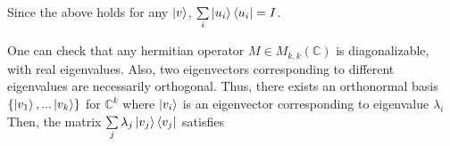 Since the above holds for any $\ket{v}$, $\sum\limits_i \ket{u_i}\bra{u_i}=I$.




\begin{comment}
Conventionally, for a ket $\ket{v}$, there is a corresponding dual vector \textit{"bra"} $\bra{v}$ such that
\begin{equation} \label{bra defn}
    \bra{v}(\ket{w}):=\braket{v|w}:=(\ket{v}, \ket{w})
\end{equation}
It turns out that the matrix representation of dual vectors is just a row vector as illustrated below:\\
Let $\{\ket{u_i}\}_{i=1}^{i=n}$ be some orthonormal basis of an inner product space V. Let $ \ket{v}=\sum_j v_j \ket{u_j}, \ket{w}=\sum_i w_i \ket{u_i}$. Since $(\ket{u_i},\ket{u_j})=\delta_{ij}$, using \eqref{inner product defn} and \eqref{bra defn}, we get
\begin{equation} \label{eqn: braket}
    \braket{v|w}=(\sum_j v_j \ket{u_j}, \sum_i w_i \ket{u_i})=\sum_i \sum_j v_i^* w_j \delta_{ij} = \sum_i v_i^* w_i = (v_1^*,\hdots, v_n^*)
    \icol{w_1\\ \vdots \\ w_n }
\end{equation}

As we can see, the bra vector $\bra{v}$ can be interpreted as the conjugate transpose of $\ket{v}$. 

In addition, a useful way of representing linear operators which makes use of the inner product is called the \textit{outer product} representation. Suppose $\ket{v} \in V, \ket{w} \in W$, where $V, W$ are both inner product space. Define $\ket{w}, \ket{v}$ to be the linear operator from V to W such that
\begin{equation}
    (\ket{w}\ket{v})(\ket{v'}):=\ket{w}\braket{v|v'}=\braket{v|v'}\ket{w}
\end{equation}

In other words, the bra-ket notation convention allows us to interpret $\ket{w}\braket{v|v'}$ in two ways: the operator $\ket{w}\bra{v}$ acting on $\ket{v'}$, or multiplying $\ket{w}$ by the complex number $\braket{v|v'}$.
\end{comment}
One can check that any hermitian operator $M \in M_{k,k}(\mathbb{C})$ is diagonalizable, with real eigenvalues.  Also, two eigenvectors corresponding to different eigenvalues are necessarily orthogonal.  Thus, there exists an orthonormal basis $\{\ket{v_1},...\ket{v_k}\}$ for $\mathbb{C}^k$ where $\ket{v_i}$ is an eigenvector corresponding to eigenvalue $\lambda_i$  Then, the matrix $\sum\limits_j \lambda_j \ket{v_j}\bra{v_j}$ satisfies

